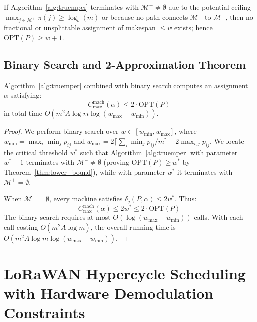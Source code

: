 \documentclass{article}
\begin{document}
\begin{theorem}
\label{thm:lower_bound}
If Algorithm~\ref{alg:truemper} terminates with $\mathcal{M}^+ \neq \emptyset$ due to the potential ceiling $\max_{j \in \mathcal{M}^+} \pi(j) \ge \log_b(m)$ or because no path connects $\mathcal{M}^+$ to $\mathcal{M}^-$, then no fractional or unsplittable assignment of makespan $\le w$ exists; hence $\text{OPT}(P) \ge w + 1$.
\end{theorem}

\subsection{Binary Search and 2-Approximation Theorem}
\begin{theorem}
\label{thm:overall_2approx}
Algorithm~\ref{alg:truemper} combined with binary search computes an assignment $\alpha$ satisfying:
\begin{equation}
C_{\max}^{\text{mach}}(\alpha) \le 2 \cdot \text{OPT}(P)
\end{equation}
in total time $O(m^2 A \log m \log(w_{\max} - w_{\min}))$.
\end{theorem}
\begin{proof}
We perform binary search over $w \in [w_{\min}, w_{\max}]$, where $w_{\min} = \max_{i} \min_j p_{ij}$ and $w_{\max} = 2 \lceil \sum_i \min_j p_{ij} / m \rceil + 2 \max_{i,j} p_{ij}$. We locate the critical threshold $w^*$ such that Algorithm~\ref{alg:truemper} with parameter $w^* - 1$ terminates with $\mathcal{M}^+ \neq \emptyset$ (proving $\text{OPT}(P) \ge w^*$ by Theorem~\ref{thm:lower_bound}), while with parameter $w^*$ it terminates with $\mathcal{M}^+ = \emptyset$.

When $\mathcal{M}^+ = \emptyset$, every machine satisfies $\delta_j(P, \alpha) \le 2w^*$.
Thus:
\begin{equation}
C_{\max}^{\text{mach}}(\alpha) \le 2w^* \le 2 \cdot \text{OPT}(P)
\end{equation}
The binary search requires at most $O(\log(w_{\max} - w_{\min}))$ calls. With each call costing $O(m^2 A \log m)$, the overall running time is $O(m^2 A \log m \log(w_{\max} - w_{\min}))$.
\end{proof}

\section{LoRaWAN Hypercycle Scheduling with Hardware Demodulation Constraints}
\label{sec:lorawan_scheduler}
\end{document}
